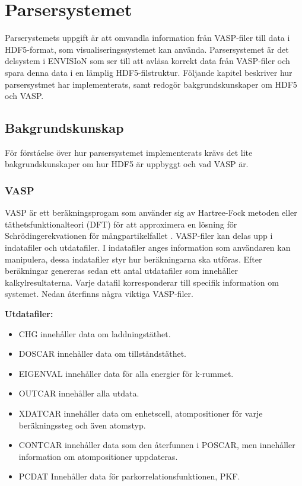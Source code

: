 \section{Parsersystemet} 
Parserystemets uppgift är att omvandla information från VASP-filer till data i HDF5-format, som visualiseringssystemet kan använda. Parsersystemet är det delsystem i ENVISIoN som ser till att avläsa korrekt data från VASP-filer och spara denna data i en lämplig HDF5-filstruktur. Följande kapitel beskriver hur parsersystmet har implementerats, samt redogör bakgrundskunskaper om HDF5 och VASP.  

\subsection{Bakgrundskunskap}
För förståelse över hur parsersystemet implementerats krävs det lite bakgrundskunskaper om hur HDF5 är uppbyggt och vad VASP är.   
\subsubsection{VASP}
VASP är ett beräkningsprogam som använder sig av Hartree-Fock metoden eller täthetsfunktionalteori (DFT) för att approximera en lösning för Schrödingerekvationen för mångpartikelfallet \cite{Quick Start Guide}. VASP-filer kan delas upp i indatafiler och utdatafiler. I indatafiler anges information som användaren kan manipulera, dessa indatafiler styr hur beräkningarna ska utföras. Efter beräkningar genereras sedan ett antal utdatafiler som innehåller kalkylresultaterna. Varje datafil korresponderar till specifik information om systemet. Nedan återfinns några viktiga VASP-filer.   

\textbf{Utdatafiler:} 
\begin{itemize}
    \setlength\itemsep{0em}
    \item CHG innehåller data om laddningstäthet.
    \item DOSCAR innehåller data om tillståndstäthet.
    \item EIGENVAL innehåller data för alla energier för k-rummet.
    \item OUTCAR innehåller alla utdata.   
    \item XDATCAR innehåller data om enhetscell, atompositioner för varje beräkningssteg och även atomstyp. 
    \item CONTCAR innehåller data som den återfunnen i POSCAR, men innehåller information om atompositioner uppdateras.  
    \item PCDAT Innehåller data för parkorrelationsfunktionen, PKF.  
\end{itemize}


